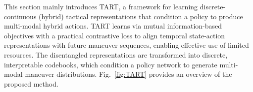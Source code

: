 This section mainly introduces TART, a framework for learning discrete-continuous (hybrid) tactical representations that condition a policy to produce multi-modal hybrid actions.
TART learns via mutual information-based objectives with a practical contrastive loss to align temporal state-action representations with future maneuver sequences, enabling effective use of limited resources.
The disentangled representations are transformed into discrete, interpretable codebooks, which condition a policy network to generate multi-modal maneuver distributions.
Fig.~\ref{fig:TART} provides an overview of the proposed method.